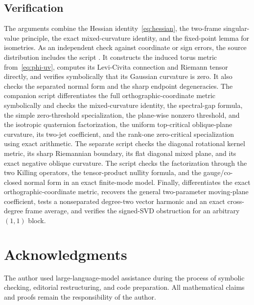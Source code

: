 \documentclass[11pt]{amsart}
\theoremstyle{definition}
\theoremstyle{remark}
\begin{document}
\subsection{Verification}

The arguments combine the Hessian identity~\eqref{eq:hessian}, the
two-frame singular-value principle, the exact mixed-curvature
identity, and the fixed-point lemma for isometries.  As an independent
check against coordinate or sign errors,
the source distribution includes the script
.  It constructs the induced torus
metric from~\eqref{eq:phi-uv}, computes its Levi-Civita connection and
Riemann tensor directly, and verifies symbolically that its Gaussian
curvature is zero.  It also checks the separated normal form and the
sharp endpoint degeneracies.  The companion script
 differentiates
the full orthographic-coordinate metric symbolically and checks the
mixed-curvature identity, the spectral-gap formula, the simple
zero-threshold specialization, the plane-wise nonzero threshold, and
the isotropic quaternion factorization, the uniform top-critical
oblique-plane curvature, its two-jet coefficient, and the rank-one
zero-critical specialization using exact arithmetic.  The separate
script  checks the diagonal rotational
kernel metric, its sharp Riemannian boundary, its flat diagonal mixed
plane, and its exact negative oblique curvature.  The script
 checks the factorization
through the two Killing operators, the tensor-product nullity formula,
and the gauge/co-closed normal form in an exact finite-mode model.  Finally,
 differentiates the exact
orthographic-coordinate metric, recovers the general two-parameter
moving-plane coefficient, tests a nonseparated degree-two vector
harmonic and an exact cross-degree frame average, and verifies the
signed-SVD obstruction for an arbitrary $(1,1)$ block.

\section*{Acknowledgments}

The author used large-language-model assistance during the process of
symbolic checking, editorial restructuring, and code preparation.  All
mathematical claims and proofs remain the responsibility of the author.
\end{document}
